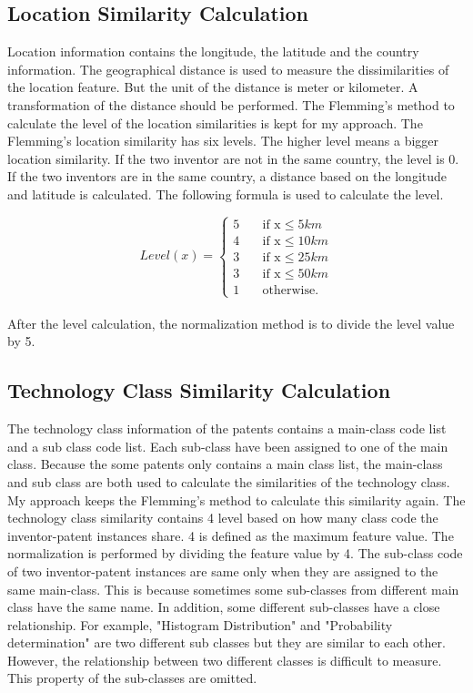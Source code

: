 \subsection{Location Similarity Calculation}
Location information contains the longitude, the latitude and the country information. The geographical distance is used to measure the dissimilarities of the location feature. But the unit of the distance is meter or kilometer. A transformation of the distance should be performed. The Flemming's method to calculate the level of the location similarities is kept for my approach. The Flemming's location similarity has six levels. The higher level means a bigger location similarity. If the two inventor are not in the same country, the level is 0. If the two inventors are in the same country, a distance based on the longitude and latitude is calculated. The following formula is used to calculate the level.

\[   
Level(x) = 
     \begin{cases}
       \text{5} &\quad\text{if x}\le5km\\
       \text{4} &\quad\text{if x}\le10km \\
       \text{3} &\quad\text{if x}\le25km\\
       \text{3} &\quad\text{if x}\le50km\\
       \text{1} &\quad\text{otherwise.} \ 
     \end{cases}
\]
\\

After the level calculation, the normalization method is to divide the level value by 5.

\subsection{Technology Class Similarity Calculation}
The technology class information of the patents contains a main-class code list and a sub class code list. Each sub-class have been assigned to one of the main class. Because the some patents only contains a main class list, the main-class and sub class are both used to calculate the similarities of the technology class. My approach keeps the Flemming's method to calculate this similarity again. The technology class similarity contains 4 level based on how many class code the inventor-patent instances share. 4 is defined as the maximum feature value. The normalization is performed by dividing the feature value by 4. The sub-class code of two inventor-patent instances are same only when they are assigned to the same main-class. This is because sometimes some sub-classes from different main class have the same name. In addition, some different sub-classes have a close relationship. For example, "Histogram Distribution" and "Probability determination" are two different sub classes but they are similar to each other. However, the relationship between two different classes is difficult to measure. This property of the sub-classes are omitted.


